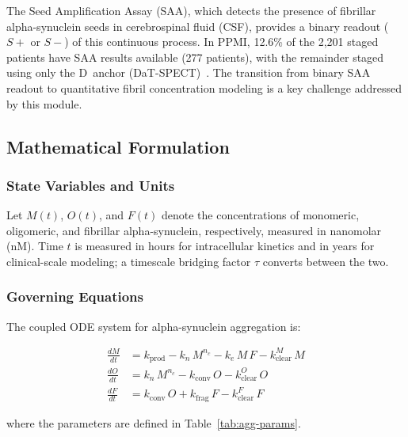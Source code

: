 The Seed Amplification Assay (SAA), which detects the presence of fibrillar alpha-synuclein seeds in cerebrospinal fluid (CSF), provides a binary readout ($S+$ or $S-$) of this continuous process. In PPMI, 12.6\% of the 2,201 staged patients have SAA results available (277 patients), with the remainder staged using only the D~anchor (DaT-SPECT)~\cite{simuni2024}. The transition from binary SAA readout to quantitative fibril concentration modeling is a key challenge addressed by this module.

\subsection{Mathematical Formulation}

\subsubsection{State Variables and Units}

Let $M(t)$, $O(t)$, and $F(t)$ denote the concentrations of monomeric, oligomeric, and fibrillar alpha-synuclein, respectively, measured in nanomolar (nM). Time $t$ is measured in hours for intracellular kinetics and in years for clinical-scale modeling; a timescale bridging factor $\tau$ converts between the two.

\subsubsection{Governing Equations}

The coupled ODE system for alpha-synuclein aggregation is:

\begin{align}
\frac{dM}{dt} &= k_\text{prod} - k_n \, M^{n_c} - k_e \, M \, F - k_\text{clear}^M \, M \label{eq:dMdt} \\
\frac{dO}{dt} &= k_n \, M^{n_c} - k_\text{conv} \, O - k_\text{clear}^O \, O \label{eq:dOdt} \\
\frac{dF}{dt} &= k_\text{conv} \, O + k_\text{frag} \, F - k_\text{clear}^F \, F \label{eq:dFdt}
\end{align}

where the parameters are defined in Table~\ref{tab:agg-params}.

